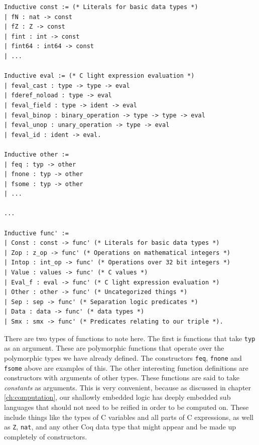 \documentclass{puthesis}
\begin{document}
\begin{lstlisting}
Inductive const := (* Literals for basic data types *)
| fN : nat -> const
| fZ : Z -> const
| fint : int -> const
| fint64 : int64 -> const
| ...

Inductive eval := (* C light expression evaluation *)
| feval_cast : type -> type -> eval
| fderef_noload : type -> eval
| feval_field : type -> ident -> eval
| feval_binop : binary_operation -> type -> type -> eval
| feval_unop : unary_operation -> type -> eval
| feval_id : ident -> eval.

Inductive other := 
| feq : typ -> other
| fnone : typ -> other
| fsome : typ -> other
| ...

...

Inductive func' :=
| Const : const -> func' (* Literals for basic data types *)
| Zop : z_op -> func' (* Operations on mathematical integers *)
| Intop : int_op -> func' (* Operations over 32 bit integers *)
| Value : values -> func' (* C values *)
| Eval_f : eval -> func' (* C light expression evaluation *)
| Other : other -> func' (* Uncategorized things *)
| Sep : sep -> func' (* Separation logic predicates *)
| Data : data -> func' (* data types *)
| Smx : smx -> func' (* Predicates relating to our triple *).

\end{lstlisting}

There are two types of functions to note here. The first is functions
that take \lstinline|typ| as an argument. These are polymorphic
functions that operate over the polymorphic types we have
already defined. The constructors \lstinline|feq|, \lstinline|fnone|
and \lstinline|fsome| above are examples of this. The other
interesting function definitions are constructors with arguments of
other types. These functions are said to take \emph{constants} as
arguments. This is very convenient, because as discussed in chapter
\ref{ch:computation}, our shallowly embedded logic has deeply embedded
sub languages that should not need to be reified
in order to be computed on. These include things like the types of C
variables and all parts of C expressions, as well as \lstinline|Z|,
\lstinline|nat|, and any other Coq data type that might appear and be
made up completely of constructors.
\end{document}
